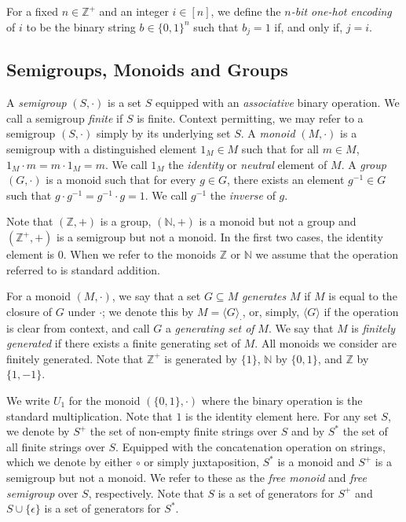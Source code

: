 \documentclass[a4paper,UKenglish,cleveref, autoref, thm-restate, anonymous]{lipics-v2021}
\begin{document}
For a fixed $n \in \mathbb{Z}^+$ and an integer $i \in [n]$, we define the \emph{$n$-bit one-hot encoding} of $i$ to be the binary string $b \in \{0,1\}^n$ such that $b_j = 1$ if, and only if,  $j = i$.

\subsection{Semigroups, Monoids and Groups}
\label{sec:backgroundsemi}

A \emph{semigroup} $(S, \cdot)$ is a set $S$ equipped with an \emph{associative} binary operation.  We call a semigroup \emph{finite} if $S$ is finite. Context permitting, we may refer to a semigroup $(S, \cdot)$ simply by its underlying set $S$.  A \emph{monoid} $(M, \cdot)$ is a semigroup with a distinguished element $1_M \in M$ such that for all $m \in M$, $1_M \cdot m = m \cdot 1_M = m$.  We call $1_M$ the \emph{identity} or \emph{neutral} element of $M$.  A \emph{group} $(G, \cdot)$ is a monoid such that for every $g \in G$, there exists an element $g^{-1} \in G$ such that $g \cdot g^{-1} = g^{-1} \cdot g = 1$.  We call $g^{-1}$ the \emph{inverse} of $g$.  

Note that $(\mathbb{Z},+)$ is a group, $(\mathbb{N},+)$ is a monoid but not a group and $(\mathbb{Z}^+,+)$ is a semigroup but not a monoid.  In the first two cases, the identity element is $0$.  When we refer to the monoids $\mathbb{Z}$ or $\mathbb{N}$ we assume that the operation referred to is standard addition.

For a monoid $(M, \cdot)$, we say that a set $G \subseteq M$ \emph{generates} $M$ if $M$ is equal to the closure of $G$ under $\cdot$; we denote this by $M = \langle G \rangle_{\cdot}$, or, simply, $\langle G \rangle$ if the operation is clear from context, and call $G$ a \emph{generating set of} $M$. We say that $M$ is \emph{finitely generated} if there exists a finite generating set of $M$.  All monoids we consider are finitely generated.  Note that $\mathbb{Z}^+$ is generated by $\{1\}$, $\mathbb{N}$ by $\{0,1\}$, and $\mathbb{Z}$ by $\{1,-1\}$.

We write $U_1$ for the monoid $(\{0,1\},\cdot)$ where the binary operation is the standard multiplication.  Note that $1$ is the identity element here.
For any set $S$, we denote by $S^+$ the set of non-empty finite strings over $S$ and by $S^*$ the set of all finite strings over $S$.  Equipped with the concatenation operation on strings, which we denote by either $\circ$ or simply juxtaposition, $S^*$ is a monoid and $S^+$ is a semigroup but not a monoid.  We refer to these as the \emph{free monoid} and \emph{free semigroup} over $S$, respectively.  Note that $S$ is a set of generators for $S^+$ and $S \cup \{\epsilon\}$ is a set of generators for $S^*$.
\end{document}
